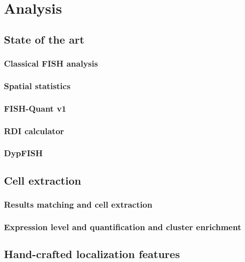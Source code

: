 
\graphicspath{{../../figures/chapter_4/}}


\chapter{Analysis} \label{chap:chapter_4}
\minitoc
\newpage


\section{State of the art}


\subsection{Classical \ac{FISH} analysis}

\subsection{Spatial statistics}

\subsection{FISH-Quant v1}

\subsection{RDI calculator}

\subsection{DypFISH}


\section{Cell extraction}


\subsection{Results matching and cell extraction}

\subsection{Expression level and quantification and cluster enrichment}


\section{Hand-crafted localization features}


